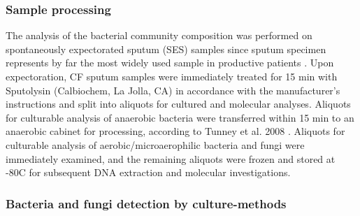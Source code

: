 \subsubsection{Sample processing}
The analysis of the bacterial community composition was performed on spontaneously expectorated sputum (SES) samples since sputum specimen represents by far the most widely used sample in productive patients \cite{rogers2010determining}. Upon expectoration, CF sputum samples were immediately treated for 15 min with Sputolysin (Calbiochem, La Jolla, CA) in accordance with the manufacturer's instructions and split into aliquots for cultured and molecular analyses. Aliquots for culturable analysis of anaerobic bacteria were transferred within 15 min to an anaerobic cabinet for processing, according to Tunney et al. 2008 \cite{tunney2008detection}. Aliquots for culturable analysis of aerobic/microaerophilic bacteria and fungi were immediately examined, and the remaining aliquots were frozen and stored at -80{\textdegree}C for subsequent DNA extraction and molecular investigations.\\

\subsubsection{Bacteria and fungi detection by culture-methods}
